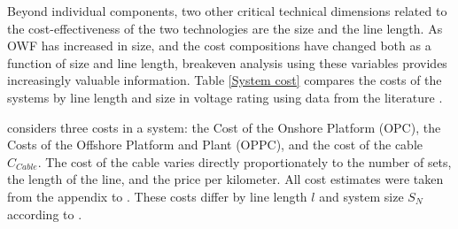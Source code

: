 \documentclass{ieeeaccess}
\begin{document}
Beyond individual components, two other critical technical dimensions related to the cost-effectiveness of the two technologies are the size and the line length. As OWF has increased in size, and the cost compositions have changed both as a function of size and line length, breakeven analysis using these variables provides increasingly valuable information. Table \ref{System cost} compares the costs of the systems by line length and size in voltage rating using data from the literature \cite{meng2021comparative}.

\cite{meng2021comparative} considers three costs in a system: the Cost of the Onshore Platform (OPC), the Costs of the Offshore Platform and Plant (OPPC), and the cost of the cable $C_{Cable}$. The cost of the cable varies directly proportionately to the number of sets, the length of the line, and the price per kilometer. All cost estimates were taken from the appendix to \cite{meng2021comparative}. These costs differ by line length $l$ and system size $S_N$ according to \cite{meng2021comparative}.
\end{document}
